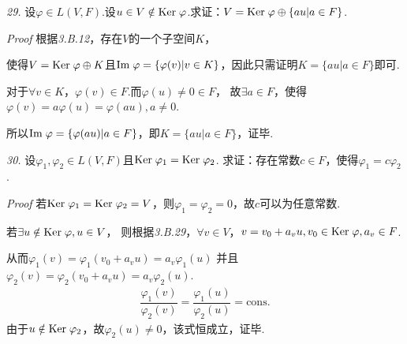 \hspace*{\fill}

\textit{29.}
设\(\varphi \in L(V,F)\).设\(u \in V \notin \mathrm{Ker \;} \varphi\).求证：\(V=\mathrm{Ker \;} \varphi \oplus \{au|a \in F\}\).

\textit{Proof}
根据\textit{3.B.12}，存在\(V\)的一个子空间\(K\)，

使得\(V=\mathrm{Ker \;} \varphi \oplus K\)且\(\mathrm{Im \;} \varphi=\{\varphi (v)|v \in K\}\)，因此只需证明\(K=\{au|a \in F\}\)即可.

对于\(\forall v \in K\)，\(\varphi(v) \in F\).而\(\varphi(u) \ne 0 \in F\)，
故\(\exists a \in F\)，使得\(\varphi(v)=a \varphi(u)=\varphi(au),a \ne 0\).

所以\(\mathrm{Im \;} \varphi=\{\varphi (au)|a \in F\}\)，即\(K=\{au|a \in F\}\)，证毕.

\hspace*{\fill}

\textit{30.}
设\(\varphi_1,\varphi_2 \in L(V,F)\)且\(\mathrm{Ker \;}  \varphi_1=\mathrm{Ker \;}  \varphi_2\).
求证：存在常数\(c \in F\)，使得\(\varphi_1=c \varphi_2\).

\textit{Proof}
若\(\mathrm{Ker \;} \varphi_1=\mathrm{Ker \;} \varphi_2=V\)，则\(\varphi_1=\varphi_2=0\)，故\(c\)可以为任意常数.

若\(\exists u \notin \mathrm{Ker \;} \varphi,u \in V\)，
则根据\textit{3.B.29}，\(\forall v \in V\)，\(v=v_0+a_vu,v_0 \in \mathrm{Ker \;} \varphi,a_v \in F\).

从而\(\varphi_1(v)=\varphi_1(v_0+a_vu)=a_v \varphi_1(u)\)
并且\(\varphi_2(v)=\varphi_2(v_0+a_vu)=a_v \varphi_2(u)\).
    \begin{align*}
        \dfrac{\varphi_1(v)}{\varphi_2(v)}=\dfrac{\varphi_1(u)}{\varphi_2(u)}=\mathrm{cons.}
    \end{align*}
由于\(u \notin \mathrm{Ker \;} \varphi_2\)，故\(\varphi_2(u) \ne 0\)，该式恒成立，证毕.

